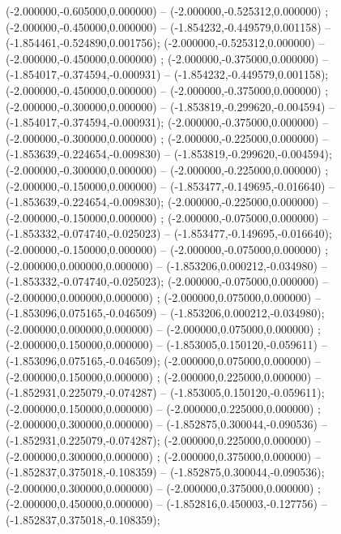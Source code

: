  (-2.000000,-0.605000,0.000000) -- (-2.000000,-0.525312,0.000000) ;
 (-2.000000,-0.450000,0.000000) -- (-1.854232,-0.449579,0.001158) -- (-1.854461,-0.524890,0.001756);
 (-2.000000,-0.525312,0.000000) -- (-2.000000,-0.450000,0.000000) ;
 (-2.000000,-0.375000,0.000000) -- (-1.854017,-0.374594,-0.000931) -- (-1.854232,-0.449579,0.001158);
 (-2.000000,-0.450000,0.000000) -- (-2.000000,-0.375000,0.000000) ;
 (-2.000000,-0.300000,0.000000) -- (-1.853819,-0.299620,-0.004594) -- (-1.854017,-0.374594,-0.000931);
 (-2.000000,-0.375000,0.000000) -- (-2.000000,-0.300000,0.000000) ;
 (-2.000000,-0.225000,0.000000) -- (-1.853639,-0.224654,-0.009830) -- (-1.853819,-0.299620,-0.004594);
 (-2.000000,-0.300000,0.000000) -- (-2.000000,-0.225000,0.000000) ;
 (-2.000000,-0.150000,0.000000) -- (-1.853477,-0.149695,-0.016640) -- (-1.853639,-0.224654,-0.009830);
 (-2.000000,-0.225000,0.000000) -- (-2.000000,-0.150000,0.000000) ;
 (-2.000000,-0.075000,0.000000) -- (-1.853332,-0.074740,-0.025023) -- (-1.853477,-0.149695,-0.016640);
 (-2.000000,-0.150000,0.000000) -- (-2.000000,-0.075000,0.000000) ;
 (-2.000000,0.000000,0.000000) -- (-1.853206,0.000212,-0.034980) -- (-1.853332,-0.074740,-0.025023);
 (-2.000000,-0.075000,0.000000) -- (-2.000000,0.000000,0.000000) ;
 (-2.000000,0.075000,0.000000) -- (-1.853096,0.075165,-0.046509) -- (-1.853206,0.000212,-0.034980);
 (-2.000000,0.000000,0.000000) -- (-2.000000,0.075000,0.000000) ;
 (-2.000000,0.150000,0.000000) -- (-1.853005,0.150120,-0.059611) -- (-1.853096,0.075165,-0.046509);
 (-2.000000,0.075000,0.000000) -- (-2.000000,0.150000,0.000000) ;
 (-2.000000,0.225000,0.000000) -- (-1.852931,0.225079,-0.074287) -- (-1.853005,0.150120,-0.059611);
 (-2.000000,0.150000,0.000000) -- (-2.000000,0.225000,0.000000) ;
 (-2.000000,0.300000,0.000000) -- (-1.852875,0.300044,-0.090536) -- (-1.852931,0.225079,-0.074287);
 (-2.000000,0.225000,0.000000) -- (-2.000000,0.300000,0.000000) ;
 (-2.000000,0.375000,0.000000) -- (-1.852837,0.375018,-0.108359) -- (-1.852875,0.300044,-0.090536);
 (-2.000000,0.300000,0.000000) -- (-2.000000,0.375000,0.000000) ;
 (-2.000000,0.450000,0.000000) -- (-1.852816,0.450003,-0.127756) -- (-1.852837,0.375018,-0.108359);
